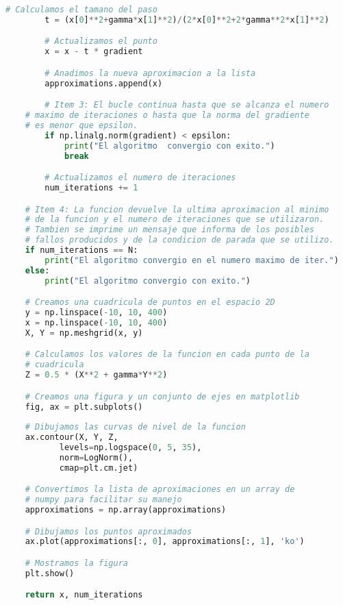 \begin{enumerate}
\begin{enumerate}[(a)]
\begin{lstlisting}[language=Python]
        # Calculamos el tamano del paso
        t = (x[0]**2+gamma*x[1]**2)/(2*x[0]**2+2*gamma**2*x[1]**2)

        # Actualizamos el punto
        x = x - t * gradient

        # Anadimos la nueva aproximacion a la lista
        approximations.append(x)

        # Item 3: El bucle continua hasta que se alcanza el numero
	# maximo de iteraciones o hasta que la norma del gradiente 
	# es menor que epsilon.
        if np.linalg.norm(gradient) < epsilon:
            print("El algoritmo  convergio con exito.")
            break

        # Actualizamos el numero de iteraciones
        num_iterations += 1

    # Item 4: La funcion devuelve la ultima aproximacion al minimo 
    # de la funcion y el numero de iteraciones que se utilizaron. 
    # Tambien se imprime un mensaje que informa de los posibles
    # fallos producidos y de la condicion de parada que se utilizo.
    if num_iterations == N:
        print("El algoritmo convergio en el numero maximo de iter.")
    else:
        print("El algoritmo convergio con exito.")

    # Creamos una cuadricula de puntos en el espacio 2D
    y = np.linspace(-10, 10, 400)
    x = np.linspace(-10, 10, 400)
    X, Y = np.meshgrid(x, y)

    # Calculamos los valores de la funcion en cada punto de la 
    # cuadricula
    Z = 0.5 * (X**2 + gamma*Y**2)

    # Creamos una figura y un conjunto de ejes en matplotlib
    fig, ax = plt.subplots()
    
    # Dibujamos las curvas de nivel de la funcion
    ax.contour(X, Y, Z, 
	       levels=np.logspace(0, 5, 35), 
	       norm=LogNorm(), 
	       cmap=plt.cm.jet)

    # Convertimos la lista de aproximaciones en un array de 
    # numpy para facilitar su manejo
    approximations = np.array(approximations)

    # Dibujamos los puntos aproximados
    ax.plot(approximations[:, 0], approximations[:, 1], 'ko')

    # Mostramos la figura
    plt.show()

    return x, num_iterations
\end{lstlisting}
    \end{enumerate}


\end{enumerate}
